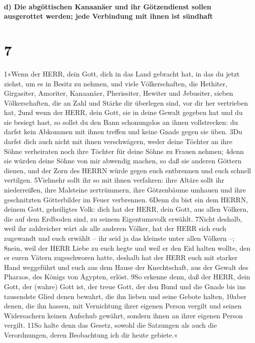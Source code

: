 \hypertarget{d-die-abguxf6ttischen-kanaanuxe4er-und-ihr-guxf6tzendienst-sollen-ausgerottet-werden-jede-verbindung-mit-ihnen-ist-suxfcndhaft}{%
\paragraph{d) Die abgöttischen Kanaanäer und ihr Götzendienst sollen
ausgerottet werden; jede Verbindung mit ihnen ist
sündhaft}\label{d-die-abguxf6ttischen-kanaanuxe4er-und-ihr-guxf6tzendienst-sollen-ausgerottet-werden-jede-verbindung-mit-ihnen-ist-suxfcndhaft}}

\hypertarget{section-6}{%
\section{7}\label{section-6}}

1»Wenn der HERR, dein Gott, dich in das Land gebracht hat, in das du
jetzt ziehst, um es in Besitz zu nehmen, und viele Völkerschaften, die
Hethiter, Girgasiter, Amoriter, Kanaanäer, Pherissiter, Hewiter und
Jebusiter, sieben Völkerschaften, die an Zahl und Stärke dir überlegen
sind, vor dir her vertrieben hat, 2und wenn der HERR, dein Gott, sie in
deine Gewalt gegeben hat und du sie besiegt hast, so sollst du den Bann
schonungslos an ihnen vollstrecken: du darfst kein Abkommen mit ihnen
treffen und keine Gnade gegen sie üben. 3Du darfst dich auch nicht mit
ihnen verschwägern, weder deine Töchter an ihre Söhne verheiraten noch
ihre Töchter für deine Söhne zu Frauen nehmen; 4denn sie würden deine
Söhne von mir abwendig machen, so daß sie anderen Göttern dienen, und
der Zorn des HERRN würde gegen euch entbrennen und euch schnell
vertilgen. 5Vielmehr sollt ihr so mit ihnen verfahren: ihre Altäre sollt
ihr niederreißen, ihre Malsteine zertrümmern, ihre Götzenbäume umhauen
und ihre geschnitzten Götterbilder im Feuer verbrennen. 6Denn du bist
ein dem HERRN, deinem Gott, geheiligtes Volk: dich hat der HERR, dein
Gott, aus allen Völkern, die auf dem Erdboden sind, zu seinem
Eigentumsvolk erwählt. 7Nicht deshalb, weil ihr zahlreicher wärt als
alle anderen Völker, hat der HERR sich euch zugewandt und euch erwählt
-- ihr seid ja das kleinste unter allen Völkern --; 8nein, weil der HERR
Liebe zu euch hegte und weil er den Eid halten wollte, den er euren
Vätern zugeschworen hatte, deshalb hat der HERR euch mit starker Hand
weggeführt und euch aus dem Hause der Knechtschaft, aus der Gewalt des
Pharaos, des Königs von Ägypten, erlöst. 9So erkenne denn, daß der HERR,
dein Gott, der (wahre) Gott ist, der treue Gott, der den Bund und die
Gnade bis ins tausendste Glied denen bewahrt, die ihn lieben und seine
Gebote halten, 10aber denen, die ihn hassen, mit Vernichtung ihrer
eigenen Person vergilt und seinen Widersachern keinen Aufschub gewährt,
sondern ihnen an ihrer eigenen Person vergilt. 11So halte denn das
Gesetz, sowohl die Satzungen als auch die Verordnungen, deren
Beobachtung ich dir heute gebiete.«

